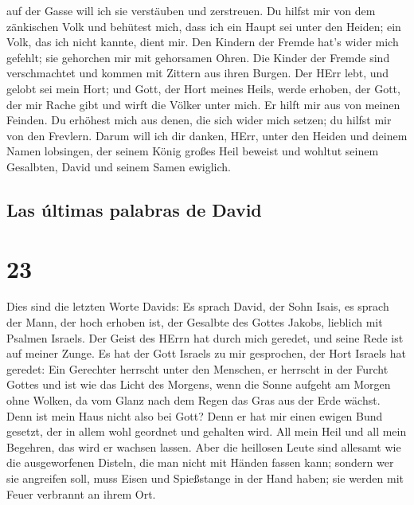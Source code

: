 auf der Gasse will ich sie verstäuben und zerstreuen.  Du
hilfst mir von dem zänkischen Volk und behütest mich, dass ich ein Haupt
sei unter den Heiden; ein Volk, das ich nicht kannte, dient mir.
 Den Kindern der Fremde hat's wider mich gefehlt; sie
gehorchen mir mit gehorsamen Ohren.  Die Kinder der
Fremde sind verschmachtet und kommen mit Zittern aus ihren Burgen.
 Der HErr lebt, und gelobt sei mein Hort; und Gott, der
Hort meines Heils, werde erhoben,  der Gott, der mir
Rache gibt und wirft die Völker unter mich.  Er hilft mir
aus von meinen Feinden. Du erhöhest mich aus denen, die sich wider mich
setzen; du hilfst mir von den Frevlern.  Darum will ich
dir danken, HErr, unter den Heiden und deinem Namen lobsingen,
 der seinem König großes Heil beweist und wohltut seinem
Gesalbten, David und seinem Samen ewiglich.

\hypertarget{las-uxfaltimas-palabras-de-david}{%
\subsection{Las últimas palabras de
David}\label{las-uxfaltimas-palabras-de-david}}

\hypertarget{section-22}{%
\section{23}\label{section-22}}

 Dies sind die letzten Worte Davids: Es sprach David, der
Sohn Isais, es sprach der Mann, der hoch erhoben ist, der Gesalbte des
Gottes Jakobs, lieblich mit Psalmen Israels.  Der Geist
des HErrn hat durch mich geredet, und seine Rede ist auf meiner Zunge.
 Es hat der Gott Israels zu mir gesprochen, der Hort
Israels hat geredet: Ein Gerechter herrscht unter den Menschen, er
herrscht in der Furcht Gottes  und ist wie das Licht des
Morgens, wenn die Sonne aufgeht am Morgen ohne Wolken, da vom Glanz nach
dem Regen das Gras aus der Erde wächst.  Denn ist mein
Haus nicht also bei Gott? Denn er hat mir einen ewigen Bund gesetzt, der
in allem wohl geordnet und gehalten wird. All mein Heil und all mein
Begehren, das wird er wachsen lassen.  Aber die heillosen
Leute sind allesamt wie die ausgeworfenen Disteln, die man nicht mit
Händen fassen kann;  sondern wer sie angreifen soll, muss
Eisen und Spießstange in der Hand haben; sie werden mit Feuer verbrannt
an ihrem Ort.


